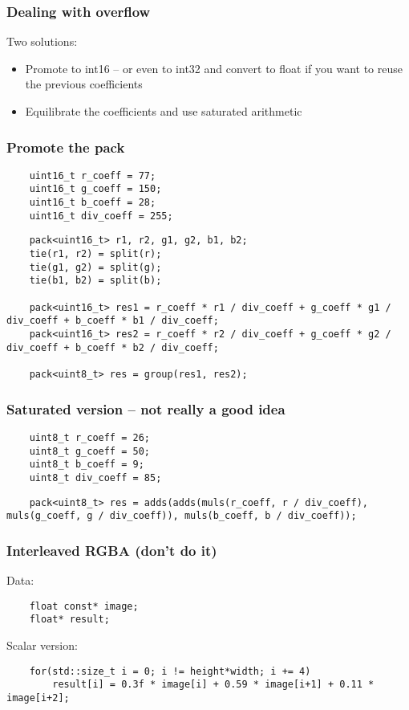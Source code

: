 \begin{frame}
	\frametitle{Dealing with overflow}
	
	Two solutions:
	\begin{itemize}
		\item Promote to int16 -- or even to int32 and convert to float if you want to reuse the previous coefficients
		\item Equilibrate the coefficients and use saturated arithmetic
	\end{itemize} 	

\end{frame}

\begin{frame}[fragile]
	\frametitle{Promote the pack}
	
	\begin{lstlisting}
	uint16_t r_coeff = 77;
	uint16_t g_coeff = 150;
	uint16_t b_coeff = 28;
	uint16_t div_coeff = 255;
	\end{lstlisting}
	
	\begin{lstlisting}	
	pack<uint16_t> r1, r2, g1, g2, b1, b2;
	tie(r1, r2) = split(r);
	tie(g1, g2) = split(g);
	tie(b1, b2) = split(b);
	
	pack<uint16_t> res1 = r_coeff * r1 / div_coeff + g_coeff * g1 / div_coeff + b_coeff * b1 / div_coeff;
	pack<uint16_t> res2 = r_coeff * r2 / div_coeff + g_coeff * g2 / div_coeff + b_coeff * b2 / div_coeff;
	
	pack<uint8_t> res = group(res1, res2);
	\end{lstlisting}
	
\end{frame}

\begin{frame}[fragile]
	\frametitle{Saturated version -- not really a good idea}
	
	\begin{lstlisting}
	uint8_t r_coeff = 26;
	uint8_t g_coeff = 50;
	uint8_t b_coeff = 9;
	uint8_t div_coeff = 85;
	\end{lstlisting}
	
	\begin{lstlisting}
	pack<uint8_t> res = adds(adds(muls(r_coeff, r / div_coeff), muls(g_coeff, g / div_coeff)), muls(b_coeff, b / div_coeff));
	\end{lstlisting}
	
\end{frame}

\begin{frame}[fragile]
	\frametitle{Interleaved RGBA (don't do it)}
	
	Data:
	\begin{lstlisting}
	float const* image;
	float* result;
	\end{lstlisting}
	\bigskip	
	
	Scalar version:
	\begin{lstlisting}
	for(std::size_t i = 0; i != height*width; i += 4)
	    result[i] = 0.3f * image[i] + 0.59 * image[i+1] + 0.11 * image[i+2];
	\end{lstlisting}
	
\end{frame}

